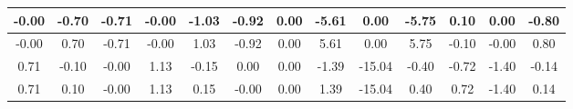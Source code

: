 \begin{tiny}\begin{tabular}{|c|c|c|c|c|c|c|c|c|c|c|c|c|}
\hline
-0.00&-0.70&-0.71&-0.00&-1.03&-0.92&0.00&-5.61&0.00&-5.75&0.10&0.00&-0.80\\\hline
-0.00&0.70&-0.71&-0.00&1.03&-0.92&0.00&5.61&0.00&5.75&-0.10&-0.00&0.80\\\hline
0.71&-0.10&-0.00&1.13&-0.15&0.00&0.00&-1.39&-15.04&-0.40&-0.72&-1.40&-0.14\\\hline
0.71&0.10&-0.00&1.13&0.15&-0.00&0.00&1.39&-15.04&0.40&0.72&-1.40&0.14\\\hline
\end{tabular}
\end{tiny}